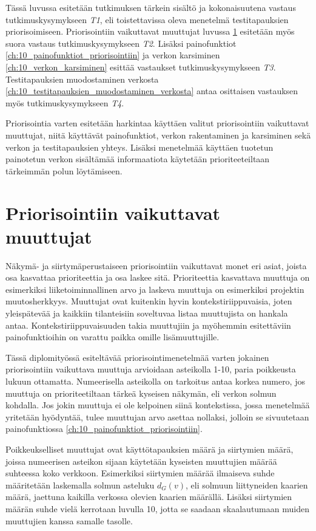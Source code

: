Tässä luvussa esitetään tutkimuksen tärkein sisältö ja kokonaisuutena vastaus tutkimuskysymykseen \emph{T1}, eli toistettavissa oleva menetelmä testitapauksien priorisoimiseen.
Priorisointiin vaikuttavat muuttujat luvussa \ref{ch:10_priorisointiin_vaikuttavat_muuttujat} esitetään myös suora vastaus tutkimuskysymykseen \emph{T2}.
Lisäksi painofunktiot \ref{ch:10_painofunktiot_priorisointiin} ja verkon karsiminen \ref{ch:10_verkon_karsiminen} esittää vastaukset tutkimuskysymykseen \emph{T3}.
Testitapauksien muodostaminen verkosta \ref{ch:10_testitapauksien_muodostaminen_verkosta} antaa osittaisen vastauksen myös tutkimuskysymykseen \emph{T4}.

Priorisointia varten esitetään harkintaa käyttäen valitut priorisointiin vaikuttavat muuttujat, niitä käyttävät painofunktiot, verkon rakentaminen ja karsiminen sekä verkon ja testitapauksien yhteys.
Lisäksi menetelmää käyttäen tuotetun painotetun verkon sisältämää informaatiota käytetään prioriteeteiltaan tärkeimmän polun löytämiseen.

\section{Priorisointiin vaikuttavat muuttujat} \label{ch:10_priorisointiin_vaikuttavat_muuttujat}

  Näkymä- ja siirtymäperustaiseen priorisointiin vaikuttavat monet eri asiat, joista osa kasvattaa prioriteettia ja osa laskee sitä.
  Prioriteettia kasvattava muuttuja on esimerkiksi liiketoiminnallinen arvo ja laskeva muuttuja on esimerkiksi projektin muutosherkkyys.
  Muuttujat ovat kuitenkin hyvin kontekstiriippuvaisia, joten yleispätevää ja kaikkiin tilanteisiin soveltuvaa listaa muuttujista on hankala antaa.
  Kontekstiriippuvaisuuden takia muuttujiin ja myöhemmin esitettäviin painofunktioihin on varattu paikka omille lisämuuttujille.

  Tässä diplomityössä esiteltävää priorisointimenetelmää varten jokainen priorisointiin vaikuttava muuttuja arvioidaan asteikolla 1-10, paria poikkeusta lukuun ottamatta.
  Numeerisella asteikolla on tarkoitus antaa korkea numero, jos muuttuja on prioriteetiltaan tärkeä kyseisen näkymän, eli verkon solmun kohdalla.
  Jos jokin muuttuja ei ole kelpoinen siinä kontekstissa, jossa menetelmää yritetään hyödyntää, tulee muuttujan arvo asettaa nollaksi, jolloin se sivuutetaan painofunktiossa \ref{ch:10_painofunktiot_priorisointiin}.

  Poikkeukselliset muuttujat ovat käyttötapauksien määrä ja siirtymien määrä, joissa numeerisen asteikon sijaan käytetään kyseisten muuttujien määrää suhteessa koko verkkoon.
  Esimerkiksi siirtymien määrää ilmaiseva suhde määritetään laskemalla solmun asteluku \(d_G(v)\), eli solmuun liittyneiden kaarien määrä, jaettuna kaikilla verkossa olevien kaarien määrällä.
  Lisäksi siirtymien määrän suhde vielä kerrotaan luvulla 10, jotta se saadaan skaalautumaan muiden muuttujien kanssa samalle tasolle.

